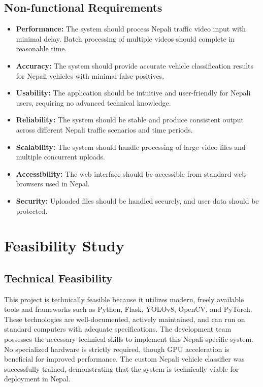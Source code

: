 \documentclass[12pt,a4paper]{report}
\begin{document}
\subsection{Non-functional Requirements}
\begin{itemize}
    \item \textbf{Performance:} The system should process Nepali traffic video input with minimal delay. Batch processing of multiple videos should complete in reasonable time.
    \item \textbf{Accuracy:} The system should provide accurate vehicle classification results for Nepali vehicles with minimal false positives.
    \item \textbf{Usability:} The application should be intuitive and user-friendly for Nepali users, requiring no advanced technical knowledge.
    \item \textbf{Reliability:} The system should be stable and produce consistent output across different Nepali traffic scenarios and time periods.
    \item \textbf{Scalability:} The system should handle processing of large video files and multiple concurrent uploads.
    \item \textbf{Accessibility:} The web interface should be accessible from standard web browsers used in Nepal.
    \item \textbf{Security:} Uploaded files should be handled securely, and user data should be protected.
\end{itemize}

\section{Feasibility Study}

\subsection{Technical Feasibility}
This project is technically feasible because it utilizes modern, freely available tools and frameworks such as Python, Flask, YOLOv8, OpenCV, and PyTorch. These technologies are well-documented, actively maintained, and can run on standard computers with adequate specifications. The development team possesses the necessary technical skills to implement this Nepali-specific system. No specialized hardware is strictly required, though GPU acceleration is beneficial for improved performance. The custom Nepali vehicle classifier was successfully trained, demonstrating that the system is technically viable for deployment in Nepal.
\end{document}
